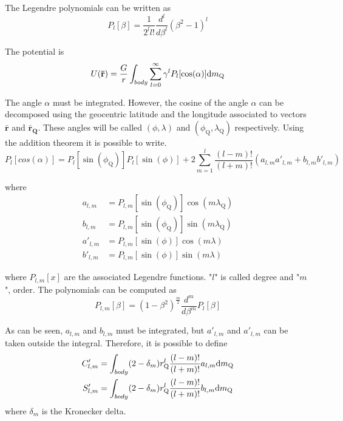 \documentclass[]{AVSSimReportMemo}
\begin{document}
The Legendre polynomials can be written as
\begin{equation}
P_l[\beta] = \frac{1}{2^l l!} \frac{d^l}{d \beta^l} (\beta^2 - 1)^l
\end{equation}

The potential is
\begin{equation}
U(\mathbf{\bar r}) = \frac{G}{r} \int_{body} \sum_{l=0}^\infty \gamma^l P_l[\cos(\alpha)] \textrm{d} m_\text{Q}
\end{equation}

The angle $\alpha$ must be integrated. However, the cosine of the angle $\alpha$ can be decomposed using the geocentric latitude and the longitude associated to vectors $\mathbf{\bar r}$ and $\mathbf{\bar r_\text{Q}}$. These angles will be called $(\phi, \lambda)$ and $(\phi_\text{Q}, \lambda_\text{Q})$ respectively. Using the addition theorem it is possible to write\cite{vallado2013}.
\begin{equation}
P_l[cos(\alpha)] = P_l[\sin(\phi_\text{Q})] P_l[\sin(\phi)] + 2 \sum_{m=1}^l \frac{(l-m)!}{(l+m)!} (a_{l,m} a'_{l,m} + b_{l,m} b'_{l,m})
\end{equation}

where
\begin{align}
a_{l,m} &= P_{l,m}[\sin(\phi_\text{Q})] \cos(m \lambda_\text{Q})\\
b_{l,m} &= P_{l,m}[\sin(\phi_\text{Q})] \sin(m \lambda_\text{Q})\\
a'_{l,m} &= P_{l,m}[\sin(\phi)] \cos(m \lambda)\\
b'_{l,m} &= P_{l,m}[\sin(\phi)] \sin(m \lambda)
\end{align}

where $P_{l,m}[x]$ are the associated Legendre functions. "$l$" is called degree and "$m$", order. The polynomials can be computed as
\begin{equation}
P_{l,m}[\beta] = (1 - \beta^2)^\frac{m}{2} \frac{d^m}{d \beta^m} P_l[\beta]\label{eq:legendre}
\end{equation}

As can be seen, $a_{l,m}$ and $b_{l,m}$ must be integrated, but $a'_{l,m}$ and $a'_{l,m}$ can be taken outside the integral.
Therefore, it is possible to define
\begin{align}
C'_{l,m} &= \int_{body} (2 -\delta_m) r_\text{Q}^l \frac{(l-m)!}{(l+m)!} a_{l,m} \textrm{d} m_\text{Q}\\
S'_{l,m} &= \int_{body} (2 -\delta_m) r_\text{Q}^l \frac{(l-m)!}{(l+m)!} b_{l,m} \textrm{d} m_\text{Q}
\end{align}
where $\delta_m$ is the Kronecker delta.
\end{document}
